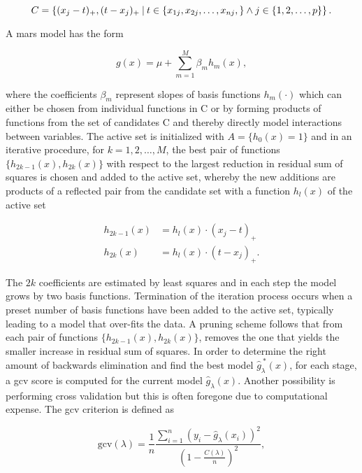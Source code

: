 \begin{equation}
  C = \left\{(x_j-t)_+, (t-x_j)_+ \:\vert\: t\in\{x_{1j}, x_{2j}, \dotsc, x_{nj}, \} \land j\in\{1, 2, \dotsc, p\} \right\}.
\end{equation}

A \gls{mars} model has the form

\begin{equation}
  g(x) = \mu + \sum_{m=1}^M \beta_m h_m(x),
\end{equation}

where the coefficients $\beta_m$ represent slopes of basis functions $h_m(\cdot)$ which can either be chosen from individual functions in C or by forming products of functions from the set of candidates C and thereby directly model interactions between variables. The active set is initialized with $A=\{h_0(x)=1\}$ and in an iterative procedure, for $k=1, 2, \dotsc, M$, the best pair of functions $\{h_{2k-1}(x), h_{2k}(x)\}$ with respect to the largest reduction in residual sum of squares is chosen and added to the active set, whereby the new additions are products of a reflected pair from the candidate set with a function $h_l(x)$ of the active set

\begin{subequations}
\begin{align}
  h_{2k-1}(x) &= h_l(x) \cdot (x_j-t)_+ \\
  h_{2k}(x) &= h_l(x) \cdot (t-x_j)_+.
\end{align}
\end{subequations}

The $2k$ coefficients are estimated by least squares and in each step the model grows by two basis functions. Termination of the iteration process occurs when a preset number of basis functions have been added to the active set, typically leading to a model that over-fits the data. A pruning scheme follows that from each pair of functions $\{h_{2k-1}(x), h_{2k}(x)\}$, removes the one that yields the smaller increase in residual sum of squares. In order to determine the right amount of backwards elimination and find the best model $\widehat{g}_\lambda^{\ *}(x)$, for each stage, a \gls{gcv} score is computed for the current model $\widehat{g}_\lambda(x)$. Another possibility is performing cross validation but this is often foregone due to computational expense. The \gls{gcv} criterion is defined as

\begin{equation}
  \text{gcv}(\lambda) = \frac{1}{n}\frac{\sum_{i=1}^n \left(y_i-\widehat{g}_\lambda(x_i)\right)^2}{\left(1-\frac{C(\lambda)}{n}\right)^2},
\end{equation}

